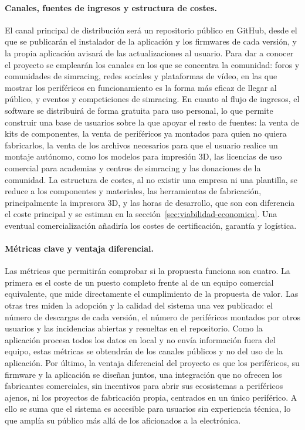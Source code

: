 \paragraph{Canales, fuentes de ingresos y estructura de costes.}
El canal principal de distribución será un repositorio público en GitHub, desde el que se publicarán el instalador de la aplicación y los firmwares de cada versión, y la propia aplicación avisará de las actualizaciones al usuario. Para dar a conocer el proyecto se emplearán los canales en los que se concentra la comunidad: foros y comunidades de simracing, redes sociales y plataformas de vídeo, en las que mostrar los periféricos en funcionamiento es la forma más eficaz de llegar al público, y eventos y competiciones de simracing. 
En cuanto al flujo de ingresos, el software se distribuirá de forma gratuita para uso personal, lo que permite construir una base de usuarios sobre la que apoyar el resto de fuentes: la venta de kits de componentes, la venta de periféricos ya montados para quien no quiera fabricarlos, la venta de los archivos necesarios para que el usuario realice un montaje autónomo, como los modelos para impresión 3D, las licencias de uso comercial para academias y centros de simracing y las donaciones de la comunidad. 
La estructura de costes, al no existir una empresa ni una plantilla, se reduce a los componentes y materiales, las herramientas de fabricación, principalmente la impresora 3D, y las horas de desarrollo, que son con diferencia el coste principal y se estiman en la sección~\ref{sec:viabilidad-economica}. Una eventual comercialización añadiría los costes de certificación, garantía y logística.

\paragraph{Métricas clave y ventaja diferencial.}
Las métricas que permitirán comprobar si la propuesta funciona son cuatro. La primera es el coste de un puesto completo frente al de un equipo comercial equivalente, que mide directamente el cumplimiento de la propuesta de valor. Las otras tres miden la adopción y la calidad del sistema una vez publicado: el número de descargas de cada versión, el número de periféricos montados por otros usuarios y las incidencias abiertas y resueltas en el repositorio. Como la aplicación procesa todos los datos en local y no envía información fuera del equipo, estas métricas se obtendrán de los canales públicos y no del uso de la aplicación. Por último, la ventaja diferencial del proyecto es que los periféricos, su firmware y la aplicación se diseñan juntos, una integración que no ofrecen los fabricantes comerciales, sin incentivos para abrir sus ecosistemas a periféricos ajenos, ni los proyectos de fabricación propia, centrados en un único periférico. A ello se suma que el sistema es accesible para usuarios sin experiencia técnica, lo que amplía su público más allá de los aficionados a la electrónica.

